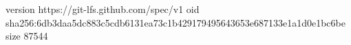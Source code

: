 version https://git-lfs.github.com/spec/v1
oid sha256:6db3daa5dc883c5cdb6131ea73c1b429179495643653e687133e1a1d0e1bc6be
size 87544
